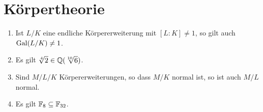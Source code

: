 \section{Körpertheorie}




\begin{question}[subtitle = Multiple Choice]
  \begin{enumerate}
    \item
      Ist $L/K$ eine endliche Körpererweiterung mit $[L : K] \neq 1$, so gilt auch $\operatorname{Gal}(L/K) \neq 1$.
    \item
      Es gilt $\sqrt[4]{2} \in \mathbb{Q}(\sqrt[10]{6})$.
    \item
      Sind $M/L/K$ Körpererweiterungen, so dass $M/K$ normal ist, so ist auch $M/L$ normal.
    \item
      Es gilt $\mathbb{F}_{8} \subseteq \mathbb{F}_{32}$.
  \end{enumerate}
\end{question}



